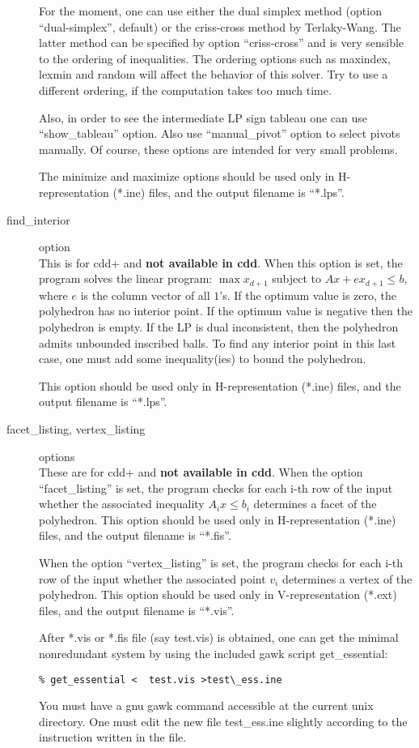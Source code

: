 \documentclass[11pt]{article}
\begin{document}
\begin{description}
For the moment,  one can use either the dual simplex
method (option ``dual-simplex'', default) 
or the criss-cross method by Terlaky-Wang.  
The latter method can be specified
by option ``criss-cross'' and is very sensible to the ordering
of inequalities.  The ordering options such as maxindex, lexmin and 
random will affect the behavior of this solver.  Try to use
a different ordering, if the computation takes too much time.

Also, in order to see the intermediate LP sign tableau 
one can use ``show\_tableau'' option.  Also use ``manual\_pivot''
option to select pivots manually.   Of course, these options are 
intended for very small problems.

The minimize and maximize options should be used only in H-representation
(*.ine) files, and the output filename is ``*.lps''.

\item[find\_interior] option\\
This is for cdd+ and {\bf not available in cdd\/}.
When this option is set, the program solves the linear program: 
$\max x_{d+1}$
subject to $ A x + e x_{d+1} \le b$, where $e$ is the
column vector of all $1$'s.  If the optimum value is zero,
the polyhedron has no interior point.  If the optimum value is 
negative then the polyhedron is empty. If the LP is dual inconsistent,
then the polyhedron admits unbounded inscribed balls.  To find any
interior point in this last case, one must add some inequality(ies)
to bound the polyhedron. 

This option should be used only in H-representation
(*.ine) files, and the output filename is ``*.lps''.

\item[facet\_listing, vertex\_listing] options\\
These are for cdd+ and {\bf not available in cdd\/}.
When the option ``facet\_listing''  is set, the program checks for each i-th row of the input 
whether the associated inequality $A_i x \le b_i$ determines a facet
of the polyhedron.    This option should be used only in H-representation
(*.ine) files, and the output filename is ``*.fis''.

When the option ``vertex\_listing''  is set, the program 
checks for each i-th row of the input 
whether the associated point  $v_i$ determines a vertex
of the polyhedron.    This option should be used only in V-representation
(*.ext) files, and the output filename is ``*.vis''.

After *.vis or *.fis file (say test.vis) is obtained,  
one can get the minimal nonredundant
system by using the included gawk script  get\_essential:
\begin{verbatim}
% get_essential <  test.vis >test\_ess.ine
\end{verbatim}
You must have a gnu gawk command accessible at
the current unix directory.  One must edit the new file
test\_ess.ine slightly according to the instruction
written in the file.


\end{description}
\end{document}

